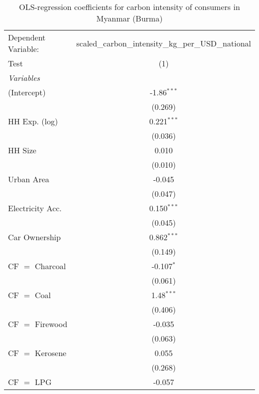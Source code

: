 
\begin{table}[htbp!]
   \centering
   \small
   \begin{adjustbox}{width = 1\textwidth, max height = 0.95\textheight, center}
      \begin{threeparttable}[b]
         \caption{\label{tab:OLS_1_MMR} OLS-regression coefficients for carbon intensity of consumers in Myanmar (Burma)}
         \begin{tabular}{lc}
            \tabularnewline \midrule \midrule
            Dependent Variable: & scaled\_carbon\_intensity\_kg\_per\_USD\_national\\        
            Test                & (1)\\  
            \midrule
            \emph{Variables}\\
            (Intercept)         & -1.86$^{***}$\\   
                                & (0.269)\\   
            HH Exp. (log)       & 0.221$^{***}$\\   
                                & (0.036)\\   
            HH Size             & 0.010\\   
                                & (0.010)\\   
            Urban Area          & -0.045\\   
                                & (0.047)\\   
            Electricity Acc.    & 0.150$^{***}$\\   
                                & (0.045)\\   
            Car Ownership       & 0.862$^{***}$\\   
                                & (0.149)\\   
            CF $=$ Charcoal     & -0.107$^{*}$\\   
                                & (0.061)\\   
            CF $=$ Coal         & 1.48$^{***}$\\   
                                & (0.406)\\   
            CF $=$ Firewood     & -0.035\\   
                                & (0.063)\\   
            CF $=$ Kerosene     & 0.055\\   
                                & (0.268)\\   
            CF $=$ LPG          & -0.057\\   

\end{tabular}
\end{threeparttable}
\end{adjustbox}
\end{table}

